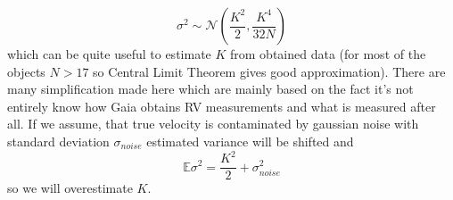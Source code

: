 \documentclass{pracalicmgr}
\begin{document}
\begin{appendices}
\begin{equation}
    \sigma^2 \sim \mathcal{N}\left(\frac{K^2}{2},\frac{K^4}{32N}\right)
\end{equation}
which can be quite useful to estimate $K$ from obtained data (for most of the objects $N>17$ so Central Limit Theorem gives good approximation).
There are many simplification made here which are mainly based on the fact it's not entirely know how Gaia obtains RV measurements and what is measured after all.
If we assume, that true velocity is contaminated by gaussian noise with standard deviation $\sigma_{noise}$ estimated variance will be shifted and 
\begin{equation}
    \mathbb{E} \sigma^2 = \frac{K^2}{2}+\sigma_{noise}^2
\end{equation} 
so we will overestimate $K$.
    \end{appendices}
\end{document}
